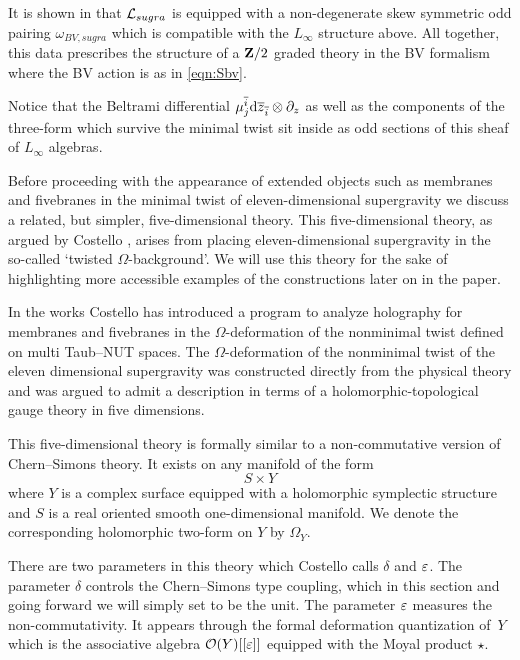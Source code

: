 \documentclass[11pt]{amsart}%
\begin{document}
It is shown in \cite{RSW} that $\mathcal L_{sugra}$ is equipped with a non-degenerate skew symmetric odd pairing $\omega_{BV,sugra}$ which is compatible with the $L_\infty$ structure above. 
All together, this data prescribes the structure of a $\mathbf{Z}/2$ graded theory in the BV formalism where the BV action is as in \eqref{eqn:Sbv}.

Notice that the Beltrami differential $\mu^{\overline{i}}_j {\rm d} \overline{z}_{\overline{i}} \otimes \partial_z$ as well as the components of the three-form which survive the minimal twist sit inside as odd sections of this sheaf of $L_\infty$ algebras.

\parsec[s:twistedsugra]

Before proceeding with the appearance of extended objects such as membranes and fivebranes in the minimal twist of eleven-dimensional supergravity we discuss a related, but simpler, five-dimensional theory.
This five-dimensional theory, as argued by Costello \cite{CostelloM5}, arises from placing eleven-dimensional supergravity in the so-called `twisted $\Omega$-background'.
We will use this theory for the sake of highlighting more accessible examples of the constructions later on in the paper. 

In the works \cite{CostelloM5,CostelloM2} Costello has introduced a program to analyze holography for membranes and fivebranes in the $\Omega$-deformation of the nonminimal twist defined on multi Taub--NUT spaces.
The $\Omega$-deformation of the nonminimal twist of the eleven dimensional supergravity was constructed directly from the physical theory and was argued to admit a description in terms of a holomorphic-topological gauge theory in five dimensions.

This five-dimensional theory is formally similar to a non-commutative version of Chern--Simons theory.
It exists on any manifold of the form
\[
  S\times Y
\]
where $Y$ is a complex surface equipped with a holomorphic symplectic structure and $S$ is a real oriented smooth one-dimensional manifold.
We denote the corresponding holomorphic two-form on $Y$ by $\Omega_Y$.

There are two parameters in this theory which Costello calls $\delta$ and $\varepsilon$.
The parameter $\delta$ controls the Chern--Simons type coupling, which in this section and going forward we will simply set to be the unit. 
The parameter $\varepsilon$ measures the non-commutativity. 
It appears through the formal deformation quantization of~$Y$ which is the associative algebra $\mathcal O(Y)[[\varepsilon]]$ equipped with the Moyal product $\star$.
\end{document}
